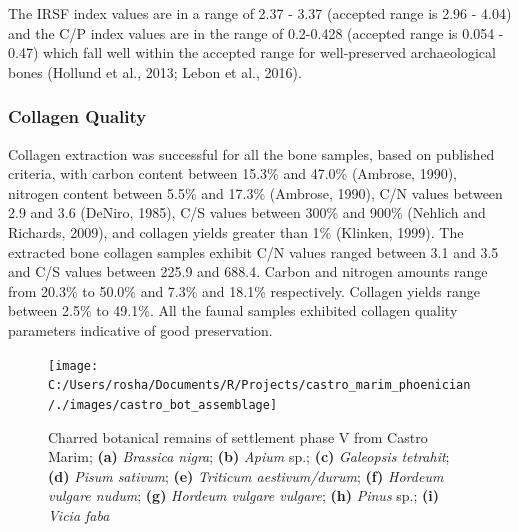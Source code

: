 \documentclass[5p]{elsarticle} %
\begin{document}
The IRSF index values are in a range of 2.37 - 3.37 (accepted range is 2.96 - 4.04) and the C/P index values are in the range of 0.2-0.428 (accepted range is 0.054 - 0.47) which fall well within the accepted range for well-preserved archaeological bones (Hollund et al., 2013; Lebon et al., 2016).

\hypertarget{collagen-quality}{%
\subsubsection{Collagen Quality}\label{collagen-quality}}

Collagen extraction was successful for all the bone samples, based on published criteria, with carbon content between 15.3\% and 47.0\% (Ambrose, 1990), nitrogen content between 5.5\% and 17.3\% (Ambrose, 1990), C/N values between 2.9 and 3.6 (DeNiro, 1985), C/S values between 300\% and 900\% (Nehlich and Richards, 2009), and collagen yields greater than 1\% (Klinken, 1999). The extracted bone collagen samples exhibit C/N values ranged between 3.1 and 3.5 and C/S values between 225.9 and 688.4. Carbon and nitrogen amounts range from 20.3\% to 50.0\% and 7.3\% and 18.1\% respectively. Collagen yields range between 2.5\% to 49.1\%. All the faunal samples exhibited collagen quality parameters indicative of good preservation.



\begin{figure}
\texttt{[image: C:/Users/rosha/Documents/R/Projects/castro\_marim\_phoenician/./images/castro\_bot\_assemblage]} \caption{Charred botanical remains of settlement phase V from Castro Marim; \textbf{(a)} \emph{Brassica nigra}; \textbf{(b)} \emph{Apium} sp.; \textbf{(c)} \emph{Galeopsis tetrahit}; \textbf{(d)} \emph{Pisum sativum}; \textbf{(e)} \emph{Triticum aestivum/durum}; \textbf{(f)} \emph{Hordeum vulgare nudum}; \textbf{(g)} \emph{Hordeum vulgare vulgare}; \textbf{(h)} \emph{Pinus} sp.; \textbf{(i)} \emph{Vicia faba}}\label{fig:castro-archbot-assemblage}
\end{figure}
\end{document}
